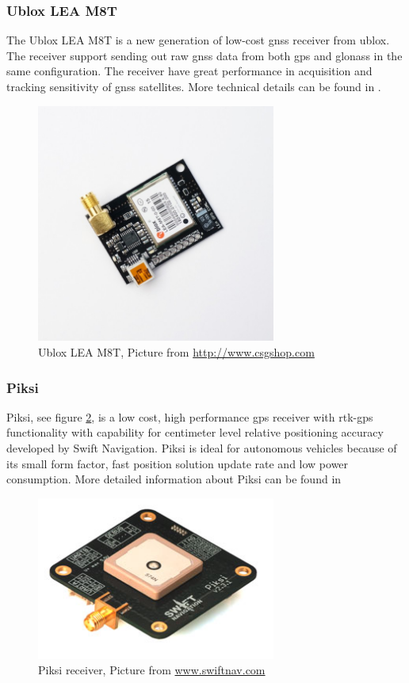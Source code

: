 \subsubsection{Ublox LEA M8T}
The Ublox LEA M8T is a new generation of low-cost \gls{gnss} receiver from ublox. The receiver support sending out raw \gls{gnss} data from both \gls{gps} and \gls{glonass} in the same configuration. The receiver have great performance in acquisition and tracking sensitivity of \gls{gnss} satellites. More technical details can be found in  \citep{UbloxDataSheet,UbloxReceiverDescription}.
\begin{figure}[H]
	\centering
		\includegraphics[width=0.7\textwidth]{figs/ubloxLeaM8T.jpg}
		\caption{Ublox LEA M8T, Picture from \url{http://www.csgshop.com}}
		\label{figure:Ublox}
\end{figure}
\subsubsection{Piksi}\label{ss:Piksi}
Piksi, see figure \ref{figure:Piksi}, is a low cost, high performance \gls{gps} receiver with \gls{rtk-gps} functionality with capability for centimeter level relative positioning accuracy developed by Swift Navigation. Piksi is ideal for autonomous vehicles because of its small form factor, fast position solution update rate and low power consumption. 
More detailed information about Piksi can be found in \citep{Piksiv231}
\begin{figure}[H]
	\centering
		\includegraphics[width=0.7\textwidth]{figs/piksi_top.jpg}
		\caption{Piksi receiver, Picture from \url{www.swiftnav.com}}
		\label{figure:Piksi}
\end{figure}
